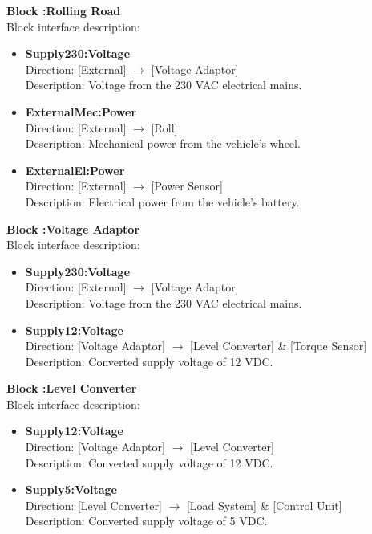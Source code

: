 \textbf{Block :Rolling Road}\\
Block interface description:
\begin{itemize}
	\item \textbf{Supply230:Voltage}\\
	Direction: [External] $\rightarrow$ [Voltage Adaptor]\\
	Description: Voltage from the 230 VAC electrical mains.
	\item \textbf{ExternalMec:Power}\\
	Direction: [External] $\rightarrow$ [Roll]\\
	Description: Mechanical power from the vehicle's wheel.
	\item \textbf{ExternalEl:Power}\\
	Direction: [External] $\rightarrow$ [Power Sensor]\\
	Description: Electrical power from the vehicle's battery.
\end{itemize}

\textbf{Block :Voltage Adaptor}\\
Block interface description:
\begin{itemize}
	\item \textbf{Supply230:Voltage}\\
	Direction: [External] $\rightarrow$ [Voltage Adaptor]\\
	Description: Voltage from the 230 VAC electrical mains.
	\item \textbf{Supply12:Voltage}\\
	Direction: [Voltage Adaptor] $\rightarrow$ [Level Converter] \& [Torque Sensor]\\
	Description: Converted supply voltage of 12 VDC.
\end{itemize}

\textbf{Block :Level Converter}\\
Block interface description:
\begin{itemize}
	\item \textbf{Supply12:Voltage}\\
	Direction: [Voltage Adaptor] $\rightarrow$ [Level Converter]\\
	Description: Converted supply voltage of 12 VDC.
	\item \textbf{Supply5:Voltage}\\
	Direction: [Level Converter] $\rightarrow$ [Load System] \& [Control Unit]\\
	Description: Converted supply voltage of 5 VDC.
\end{itemize}

